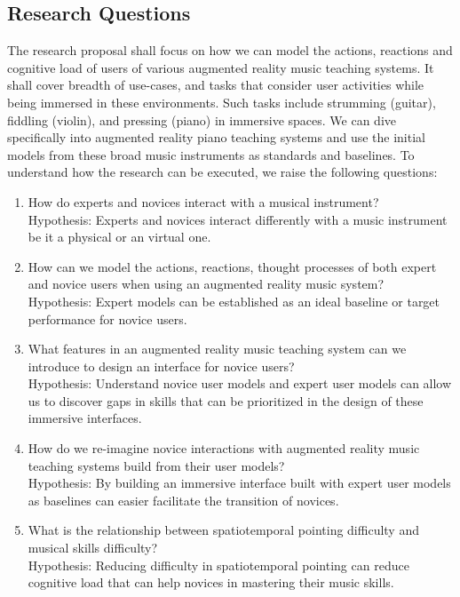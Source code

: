 \documentclass{article}
\begin{document}
\subsection{Research Questions}
The research proposal shall focus on how we can model the actions, reactions and cognitive load of users of various augmented reality music teaching systems. It shall cover breadth of use-cases, and tasks that consider user activities while being immersed in these environments. Such tasks include strumming (guitar), fiddling (violin), and pressing (piano) in immersive spaces. We can dive specifically into augmented reality piano teaching systems  and use the initial models from these broad music instruments as standards and baselines. To understand how the research can be executed, we raise the following questions: 
\begin{enumerate}
    \item How do experts and novices interact with a musical instrument?\\
    Hypothesis: Experts and novices interact differently with a music instrument be it a physical or an virtual one. 
    \item How can we model the actions, reactions, thought processes of both expert and novice users when using an augmented reality music system?\\
    Hypothesis: Expert models can be established as an ideal baseline or target performance for novice users.
    \item What features in an augmented reality music teaching system can we introduce to design an interface for novice users?\\
    Hypothesis: Understand novice user models and expert user models can allow us to discover gaps in skills that can be prioritized in the design of these immersive interfaces. 
    \item How do we re-imagine novice interactions with augmented reality music teaching systems build from their user models?\\
    Hypothesis: By building an immersive interface built with expert user models as baselines can easier facilitate the transition of novices. 
    \item What is the relationship between spatiotemporal pointing difficulty and musical skills difficulty?\\
    Hypothesis: Reducing difficulty in spatiotemporal pointing can reduce cognitive load that can help novices in mastering their music skills. 
\end{enumerate}
\end{document}
